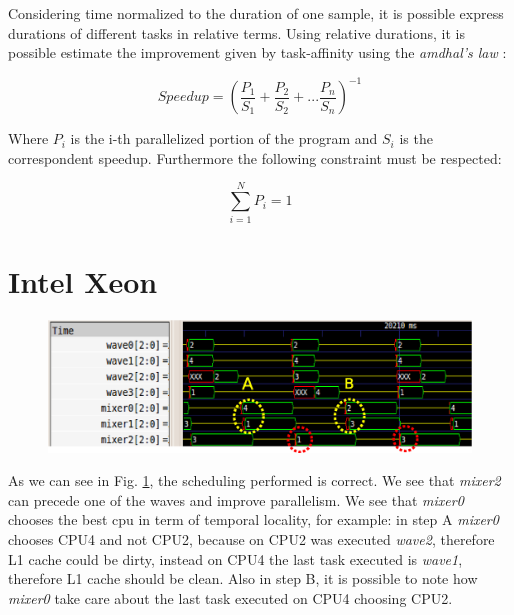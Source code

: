 Considering time normalized to the duration of one sample, it is possible express durations of different tasks in relative terms.
Using relative durations, it is possible estimate the improvement given by task-affinity using the \textit{amdhal's law} \cite{lcs}:

\begin{equation}
       Speedup = \left(\frac{P_{1}}{S_{1}} + \frac{P_{2}}{S_{2}} + ... \frac{P_{n}}{S_{n}} \right)^{-1} 
\label{eq:amdhal}
\end{equation}

Where $P_{i}$ is the i-th parallelized portion of the program and $S_{i}$ is the correspondent speedup. Furthermore the following constraint must be 
respected:

\begin{equation}
       \sum_{i=1}^N P_{i} = 1
\label{eq:contr_amdhal}
\end{equation}
\newpage

\section{Intel Xeon}

\begin{figure}[htbp]
\centering
\includegraphics[width=\widefigure]{images/results_xeon/final_xeon.eps}
\caption{}
\label{fig:trace_xeon}
\end{figure}

As we can see in Fig. \ref{fig:trace_xeon}, the scheduling performed is correct. We see that \textit{mixer2} can precede one of the waves and improve 
parallelism. We see that \textit{mixer0} chooses the best cpu in term of temporal locality, for example: in step A \textit{mixer0} chooses CPU4 and not 
CPU2, because on CPU2 was executed \textit{wave2}, therefore L1 cache could be dirty, instead on CPU4 the last task executed is \textit{wave1}, therefore 
L1 cache should be clean. Also in step B, it is possible to note how \textit{mixer0} take care about the last task executed on CPU4 choosing CPU2.

